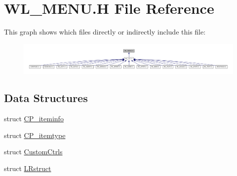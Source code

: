 \hypertarget{WL__MENU_8H}{
\section{WL\_\-MENU.H File Reference}
\label{WL__MENU_8H}
}
This graph shows which files directly or indirectly include this file:
\nopagebreak
\begin{figure}[H]
\begin{center}
\leavevmode
\includegraphics[width=400pt]{WL__MENU_8H__dep__incl}
\end{center}
\end{figure}
\subsection*{Data Structures}
\begin{DoxyCompactItemize}
\item 
struct \hyperlink{structCP__iteminfo}{CP\_\-iteminfo}
\item 
struct \hyperlink{structCP__itemtype}{CP\_\-itemtype}
\item 
struct \hyperlink{structCustomCtrls}{CustomCtrls}
\item 
struct \hyperlink{structLRstruct}{LRstruct}
\end{DoxyCompactItemize}
